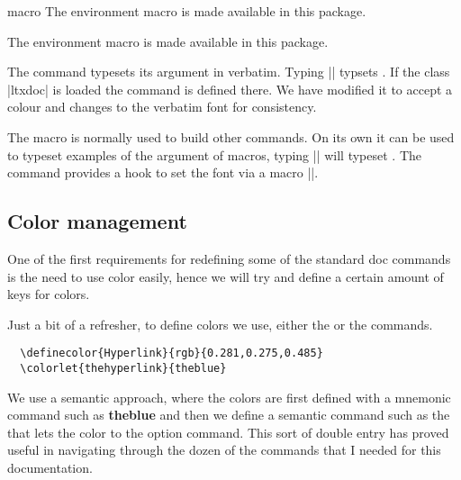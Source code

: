\begin{environment}{macro} The environment macro is made available in this
package. 
\end{environment}

 The environment macro is made available in this package. 

\begin{macro}{\cmd} The command \cmd{\cmd} typesets its argument in
  verbatim. Typing |\cmd{\cmd}| typsets \cmd{\cmd}. If the class
  |ltxdoc| is loaded the command is defined there. We have modified
  it to accept a colour and changes to the verbatim font 
  for consistency.
\end{macro}

\begin{macro}{\meta}
The macro  is normally used to build other commands. On its own it can be used to typeset
examples of the argument of macros, typing || will typeset . The command provides a hook to set the font via a macro |\meta@font@select|. 
\end{macro}


\def\meta@font@select{\upshape\color{teal}}


\subsection{Color management}
One of the first requirements for redefining some of the standard doc commands is the need to use color easily, hence we will try and define a certain amount of keys for colors.

Just a bit of a refresher, to define colors we use, either the  or the  commands.

\begin{tcolorbox}
\begin{lstlisting}
  \definecolor{Hyperlink}{rgb}{0.281,0.275,0.485}
  \colorlet{thehyperlink}{theblue}
\end{lstlisting}
\end{tcolorbox}

We use a semantic approach, where the colors are first defined with a mnemonic command such as {\bfseries\textcolor{theblue}{theblue}} and then we define a semantic command such as the that lets the color to the option command. This sort of double entry has proved useful in navigating through the dozen of the commands that I needed for this documentation.


